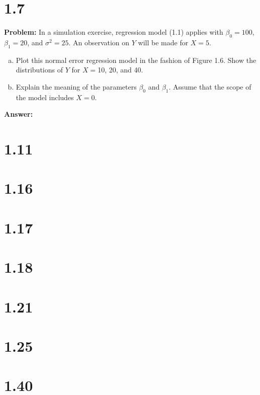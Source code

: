 \documentclass[12pt]{article}
\begin{document}
\section*{1.7}
\textbf{Problem:}
In a simulation exercise, regression model (1.1) applies with $\beta_0=100$,$\beta_1=20$, and $\sigma^2=25$. An observation on $Y$ will be made for $X=5$.
\begin{enumerate}[a)]
    \item Plot this normal error regression model in the fashion of Figure 1.6. Show the distributions of $Y$ for $X=$10, 20, and 40.
    \item Explain the meaning of the parameters $\beta_0$ and $\beta_1$. Assume that the scope of the model includes $X=0$.
\end{enumerate}
\textbf{Answer:}


\section*{1.11}

\section*{1.16}

\section*{1.17}

\section*{1.18}

\section*{1.21}

\section*{1.25}

\section*{1.40}
\end{document}

